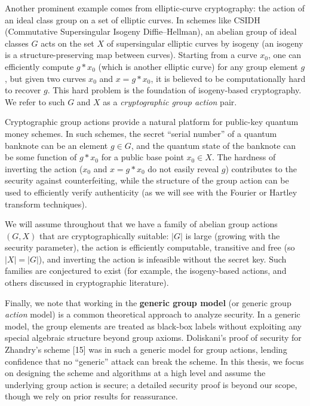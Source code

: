 \documentclass[11pt]{article}
\theoremstyle{definition}
\begin{document}
Another prominent example comes from elliptic-curve cryptography: the action of an ideal class group on a set of elliptic curves. In schemes like CSIDH (Commutative Supersingular Isogeny Diffie–Hellman), an abelian group of ideal classes $G$ acts on the set $X$ of supersingular elliptic curves by isogeny (an isogeny is a structure-preserving map between curves). Starting from a curve $x_0$, one can efficiently compute $g * x_0$ (which is another elliptic curve) for any group element $g$, but given two curves $x_0$ and $x = g * x_0$, it is believed to be computationally hard to recover $g$. This hard problem is the foundation of isogeny-based cryptography. We refer to such $G$ and $X$ as a \emph{cryptographic group action} pair.

Cryptographic group actions provide a natural platform for public-key quantum money schemes. In such schemes, the secret “serial number” of a quantum banknote can be an element $g \in G$, and the quantum state of the banknote can be some function of $g*x_0$ for a public base point $x_0 \in X$. The hardness of inverting the action ($x_0$ and $x = g*x_0$ do not easily reveal $g$) contributes to the security against counterfeiting, while the structure of the group action can be used to efficiently verify authenticity (as we will see with the Fourier or Hartley transform techniques).

We will assume throughout that we have a family of abelian group actions $(G,X)$ that are cryptographically suitable: $|G|$ is large (growing with the security parameter), the action is efficiently computable, transitive and free (so $|X|=|G|$), and inverting the action is infeasible without the secret key. Such families are conjectured to exist (for example, the isogeny-based actions, and others discussed in cryptographic literature). 

Finally, we note that working in the \textbf{generic group model} (or generic group \emph{action} model) is a common theoretical approach to analyze security. In a generic model, the group elements are treated as black-box labels without exploiting any special algebraic structure beyond group axioms. Doliskani’s proof of security for Zhandry’s scheme [15] was in such a generic model for group actions, lending confidence that no “generic” attack can break the scheme. In this thesis, we focus on designing the scheme and algorithms at a high level and assume the underlying group action is secure; a detailed security proof is beyond our scope, though we rely on prior results for reassurance.
\end{document}
